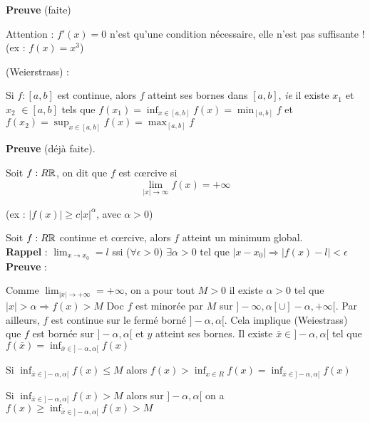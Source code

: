 		\textbf{Preuve} (faite)
		
		Attention : $f'(x) = 0$ n'est qu'une condition nécessaire, elle n'est pas suffisante ! (ex : $f(x) = x^3$)
		
		\begin{theoreme} (Weierstrass) :
		
		Si $f : [a, b]$ est continue, alors $f$ atteint ses bornes dans $[a, b]$, \textit{ie} il existe $x_1$ et $x_2$ $ \in [a, b]$ tels que $\displaystyle f(x_1) = \inf_{x \in [a, b]} f(x) = \min_{[a, b]} f$ et $\displaystyle f(x_2) = \sup_{x \in [a, b]} f(x) = \max_{[a, b]} f$ \\
		\end{theoreme}
		
		\textbf{Preuve} (déjà faite).\\
		
		\begin{definition}
		
		Soit $f : R \mathbb{R}$, on dit que $f$ est c\oe rcive si \[ \lim_{|x| \rightarrow \infty} f(x) = + \infty \]
		\end{definition}
		
		(ex : $|f(x)| \geq c|x|^\alpha$, avec $\alpha > 0$)
		
		Soit $f : R \mathbb{R}$ continue et c\oe rcive, alors $f$ atteint un minimum global.\\
		
		\textbf{Rappel} : $\displaystyle \lim_{x \rightarrow x_0} = l$ ssi ($\forall \epsilon >0$) $\exists \alpha >0$ tel que $|x-x_0| \Rightarrow |f(x) - l| < \epsilon$\\
		
		\textbf{Preuve} :
		
		Comme $\displaystyle \lim_{|x| \rightarrow + \infty} = +\infty$, on a pour tout $M>0$ il existe $\alpha >0$ tel que $|x|>\alpha \Rightarrow f(x)>M$
		Doc $f$ est minorée par $M$ sur $]-\infty, \alpha[ \cup ]-\alpha, +\infty[$. Par ailleurs, $f$ est continue sur le fermé borné $]-\alpha, \alpha[$.
		Cela implique (Weiestrass) que $f$ est bornée sur $]-\alpha, \alpha[$ et $y$ atteint ses bornes.
		Il existe $ \bar{x} \in ]-\alpha, \alpha[$ tel que $\displaystyle f(\bar{x}) = \inf_{\bar{x} \in ]-\alpha, \alpha[} f(x)$
		
		Si $\displaystyle \inf_{\bar{x} \in ]-\alpha, \alpha[} f(x) \leq M$ alors $\displaystyle f(x) > \inf_{x \in R} f(x) = \inf_{\bar{x} \in ]-\alpha, \alpha[} f(x)$
		
		Si $\displaystyle \inf_{\bar{x} \in ]-\alpha, \alpha[} f(x) > M$ alors sur $]-\alpha, \alpha[$ on a $\displaystyle f(x) \geq \inf_{\bar{x} \in ]-\alpha, \alpha[} f(x) > M$
		
